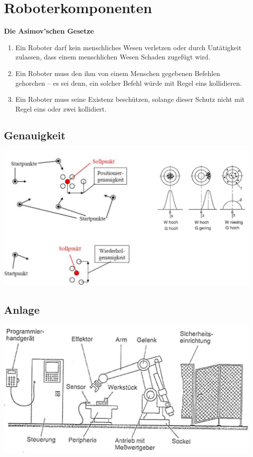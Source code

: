 \section{Roboterkomponenten}
\textbf{Die Asimov’schen Gesetze}\newline
\begin{enumerate}
    \item Ein Roboter darf kein menschliches Wesen verletzen oder durch Untätigkeit zulassen, dass einem menschlichen Wesen Schaden zugefügt wird.
    \item Ein Roboter muss den ihm von einem Menschen gegebenen Befehlen gehorchen – es sei denn, ein solcher Befehl würde mit Regel eins kollidieren.
    \item Ein Roboter muss seine Existenz beschützen, solange dieser Schutz nicht mit Regel eins oder zwei kollidiert.
\end{enumerate}
\begin{minipage}{0.5\linewidth}
\subsection{Genauigkeit}
\includegraphics[width=\linewidth]{./bilder/genauigkeit.png}
\subsection{Anlage}
\includegraphics[width=\linewidth]{./bilder/anlage.png}
\end{minipage}
